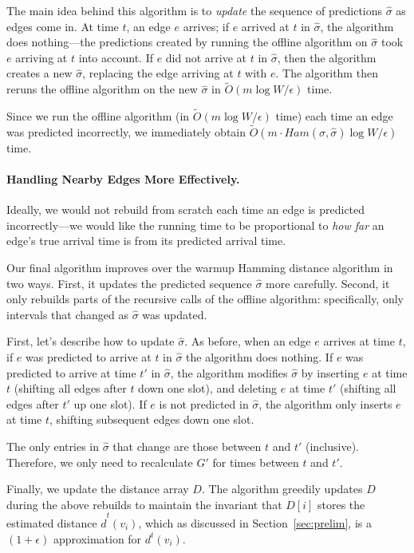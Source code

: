 The main idea behind this algorithm is to \emph{update} the sequence of predictions $\hat{\sigma}$ as edges come in.  At time $t$, an edge $e$ arrives; if $e$ arrived at $t$ in $\hat{\sigma}$, the algorithm does nothing---the predictions created by running the offline algorithm on $\hat{\sigma}$ took $e$ arriving at $t$ into account.  If $e$ did not arrive at $t$ in $\hat{\sigma}$, then the algorithm creates a new $\hat{\sigma}$, replacing the edge arriving at $t$ with $e$.  The algorithm then reruns the offline algorithm on the new $\hat{\sigma}$ in $\tilde{O}(m\log W/\epsilon)$ time.

Since we run the offline algorithm (in $\tilde{O}(m\log W/\epsilon)$ time) each time an edge was predicted incorrectly, we immediately obtain $\tilde{O}(m\cdot Ham(\sigma, \hat{\sigma})\log W/\epsilon)$ time.

\paragraph{Handling Nearby Edges More Effectively.}
Ideally, we would not rebuild from scratch each time an edge is predicted incorrectly---we would like the running time to be proportional to \emph{how far} an edge's true arrival time is from its predicted arrival time.  

Our final algorithm improves over the warmup Hamming distance algorithm in two ways.  First, it updates the predicted sequence $\hat{\sigma}$ more carefully.  Second, it only rebuilds parts of the recursive calls of the offline algorithm: specifically, only intervals that changed as $\hat{\sigma}$ was updated.

First, let's describe how to update $\hat{\sigma}$.  As before, when an edge $e$ arrives at time $t$, if $e$ was predicted to arrive at $t$ in $\hat{\sigma}$ the algorithm does nothing.  
If $e$ was predicted to arrive at time $t'$ in $\hat{\sigma}$, the algorithm modifies $\hat{\sigma}$ by inserting $e$ at time $t$ (shifting all edges after $t$ down one slot), and deleting $e$ at time $t'$ (shifting all edges after $t'$ up one slot).
If $e$ is not predicted in $\hat{\sigma}$, the algorithm only inserts $e$ at time $t$, shifting subsequent edges down one slot.

The only entries in $\hat{\sigma}$ that change are those between $t$ and $t'$ (inclusive).  Therefore, we only need to recalculate $G'$ for times between $t$ and $t'$.  

Finally, we update the distance array $D$.  The algorithm greedily updates $D$ during the above rebuilds to maintain the invariant that $D[i]$ stores the estimated distance $\hat{d}^t(v_i)$, which as discussed in Section~\ref{sec:prelim}, is a $(1+\epsilon)$ approximation for $d^t(v_i)$.

